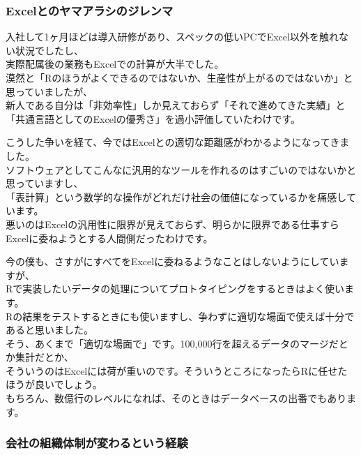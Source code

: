 \documentclass[
  letterpaper,
  DIV=11,
  numbers=noendperiod]{scrartcl}
\begin{document}
\hypertarget{excelux3068ux306eux30e4ux30deux30a2ux30e9ux30b7ux306eux30b8ux30ecux30f3ux30de}{%
\subsubsection{Excelとのヤマアラシのジレンマ}\label{excelux3068ux306eux30e4ux30deux30a2ux30e9ux30b7ux306eux30b8ux30ecux30f3ux30de}}

入社して1ヶ月ほどは導入研修があり、スペックの低いPCでExcel以外を触れない状況でしたし、\\
実際配属後の業務もExcelでの計算が大半でした。\\
漠然と「Rのほうがよくできるのではないか、生産性が上がるのではないか」と思っていましたが、\\
新人である自分は「非効率性」しか見えておらず「それで進めてきた実績」と\\
「共通言語としてのExcelの優秀さ」を過小評価していたわけです。

こうした争いを経て、今ではExcelとの適切な距離感がわかるようになってきました。\\
ソフトウェアとしてこんなに汎用的なツールを作れるのはすごいのではないかと思っていますし、\\
「表計算」という数学的な操作がどれだけ社会の価値になっているかを痛感しています。\\
悪いのはExcelの汎用性に限界が見えておらず、明らかに限界である仕事すらExcelに委ねようとする人間側だったわけです。

今の僕も、さすがにすべてをExcelに委ねるようなことはしないようにしていますが、\\
Rで実装したいデータの処理についてプロトタイピングをするときはよく使います。\\
Rの結果をテストするときにも使いますし、争わずに適切な場面で使えば十分であると思いました。\\
そう、あくまで「適切な場面で」です。100,000行を超えるデータのマージだとか集計だとか、\\
そういうのはExcelには荷が重いのです。そういうところになったらRに任せたほうが良いでしょう。\\
もちろん、数億行のレベルになれば、そのときはデータベースの出番でもあります。

\hypertarget{ux4f1aux793eux306eux7d44ux7e54ux4f53ux5236ux304cux5909ux308fux308bux3068ux3044ux3046ux7d4cux9a13}{%
\subsubsection{会社の組織体制が変わるという経験}\label{ux4f1aux793eux306eux7d44ux7e54ux4f53ux5236ux304cux5909ux308fux308bux3068ux3044ux3046ux7d4cux9a13}}
\end{document}
